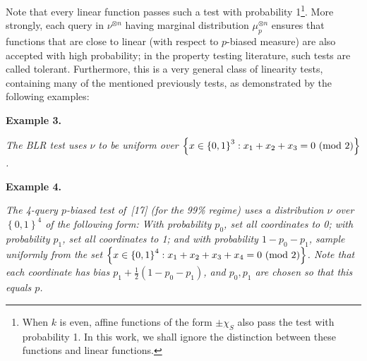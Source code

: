 



Note that every linear function passes such a test with probability 1\footnote{When $k$ is even, affine functions of the form $\pm\chi_{S}$ also pass the test with probability 1. In this work, we shall ignore the distinction between these functions and linear functions.}.
More strongly, each query in $\nu^{\otimes n}$ having marginal distribution $\mu_{p}^{\otimes n}$ ensures that functions that are close to linear (with respect to $p$-biased measure) are also accepted with high probability; in the property testing literature, such tests are called tolerant.
Furthermore, this is a very general class of linearity tests, containing many of the mentioned previously tests, as demonstrated by the following examples:\par





\par\medskip\noindent\textbf{
\textbf{Example 3}\textbf{.}
}\par



\emph{The BLR test uses $\nu$ to be uniform over ${\left\{x\in\left\{0,1\right\}^{3}:x_{1}+x_{2}+x_{3}=0\textnormal{ (mod 2)}\right\}}$.}\par







\par\medskip\noindent\textbf{
\textbf{Example 4}\textbf{.}
}\par



\emph{The 4-query $p$-biased test of [17] (for the 99\% regime) uses a distribution $\nu$ over $\left\{0,1\right\}^{4}$ of the following form:
With probability $p_{0}$, set all coordinates to 0; with probability $p_{1}$, set all coordinates to 1; and with probability $1-p_{0}-p_{1}$, sample uniformly from the set $\left\{x\in\left\{0,1\right\}^{4}:x_{1}+x_{2}+x_{3}+x_{4}=0\textnormal{ (mod 2)}\right\}$.
Note that each coordinate has bias $p_{1}+\frac{1}{2}\left(1-p_{0}-p_{1}\right)$, and $p_{0},p_{1}$ are chosen so that this equals $p$.}\par






